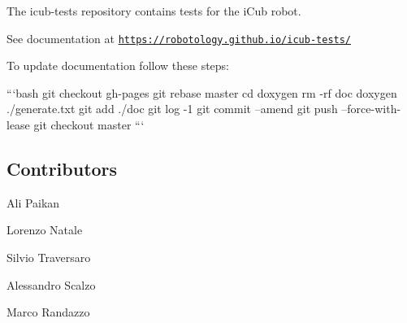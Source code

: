 The {\ttfamily icub-\/tests} repository contains tests for the i\-Cub robot.

See documentation at \href{https://robotology.github.io/icub-tests/}{\tt https\-://robotology.\-github.\-io/icub-\/tests/}

To update documentation follow these steps\-:

```bash git checkout gh-\/pages git rebase master cd doxygen rm -\/rf doc doxygen ./generate.txt git add ./doc git log -\/1 git commit --amend git push --force-\/with-\/lease git checkout master ```

\subsection*{Contributors}


\begin{DoxyItemize}
\item Ali Paikan
\item Lorenzo Natale
\item Silvio Traversaro
\item Alessandro Scalzo
\item Marco Randazzo 
\end{DoxyItemize}